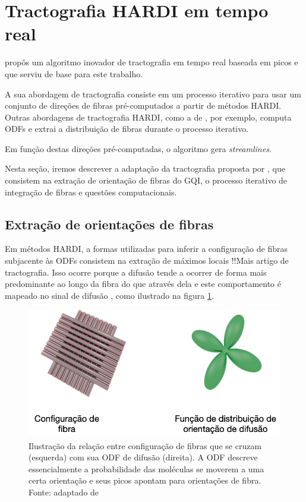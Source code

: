 \documentclass[
    12pt,                %
    oneside,            %
    a4paper,            %
    english,            %
    french,                %
    spanish,            %
    brazil                %
    ]{abntex2}
\begin{document}
\section{Tractografia HARDI em tempo real}

 propôs um algoritmo inovador de tractografia em tempo real baseada em picos e que serviu de base para este trabalho.

A sua abordagem de tractografia consiste em um processo iterativo para usar um conjunto de direções de fibras pré-computados a partir de métodos HARDI. Outras abordagens de tractografia HARDI, como a de , por exemplo, computa ODFs e extrai a distribuição de fibras durante o processo iterativo.

Em função destas direções pré-computadas, o algoritmo gera \textit{streamlines}.

Nesta seção, iremos descrever a adaptação da tractografia proposta por \cite{Chamberland2016}, que consistem na extração de orientação de fibras do GQI, o processo iterativo de integração de fibras e questões computacionais.


\subsection{Extração de orientações de fibras}

Em métodos HARDI, a formas utilizadas para inferir a configuração de fibras subjacente às ODFs consistem na extração de máximos locais \cite{descoteaux2007}!!Mais artigo de tractografia. Isso ocorre porque a difusão tende a ocorrer de forma mais predominante ao longo da fibra do que através dela e este comportamento é mapeado no sinal de difusão \cite{DTI_Handbook}, como ilustrado na figura \ref{fig::fibravsodf}.


\begin{figure}[h]
    \centering
    \includegraphics[width=.45\linewidth, angle=0]{figs/Tractografia/FibraVSodf.png}
     \caption{Ilustração da relação entre configuração de fibras que se cruzam (esquerda) com sua ODF de difusão (direita). A ODF descreve essencialmente a probabilidade das moléculas se moverem a uma certa orientação e seus picos apontam para orientações de fibra. \\
     Fonte: adaptado de \cite{DTI_Handbook}
     }
     \label{fig::fibravsodf}
\end{figure}
\end{document}
